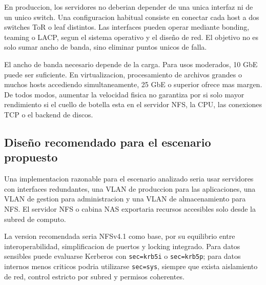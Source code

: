 En produccion, los servidores no deberian depender de una unica interfaz ni de un unico switch. Una configuracion habitual consiste en conectar cada host a dos switches ToR o leaf distintos. Las interfaces pueden operar mediante bonding, teaming o LACP, segun el sistema operativo y el diseño de red. El objetivo no es solo sumar ancho de banda, sino eliminar puntos unicos de falla.

El ancho de banda necesario depende de la carga. Para usos moderados, 10 GbE puede ser suficiente. En virtualizacion, procesamiento de archivos grandes o muchos hosts accediendo simultaneamente, 25 GbE o superior ofrece mas margen. De todos modos, aumentar la velocidad fisica no garantiza por si solo mayor rendimiento si el cuello de botella esta en el servidor NFS, la CPU, las conexiones TCP o el backend de discos.

\subsection{Diseño recomendado para el escenario propuesto}

Una implementacion razonable para el escenario analizado seria usar servidores con interfaces redundantes, una VLAN de produccion para las aplicaciones, una VLAN de gestion para administracion y una VLAN de almacenamiento para NFS. El servidor NFS o cabina NAS exportaria recursos accesibles solo desde la subred de computo.

La version recomendada seria NFSv4.1 como base, por su equilibrio entre interoperabilidad, simplificacion de puertos y locking integrado. Para datos sensibles puede evaluarse Kerberos con \texttt{sec=krb5i} o \texttt{sec=krb5p}; para datos internos menos criticos podria utilizarse \texttt{sec=sys}, siempre que exista aislamiento de red, control estricto por subred y permisos coherentes.
